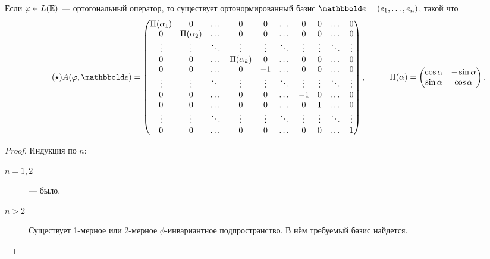 \documentclass[a4paper]{article}
\begin{document}
\begin{colloq}
            \begin{theorem}
                Если $\varphi \in L(\mathbb{E})$ --- ортогональный оператор, то существует ортонормированный базис $\E = (e_1, \dots, e_n)$, такой что 
                \begin{equation*}
                    \label{lec30:zhopa}
                    \tag{$\star$}
                    A(\phi, \E) = \begin{pmatrix} 
                        \Pi(\alpha_1) & 0 & \dots & 0 & 0 & \dots & 0 & 0 & \dots & 0 \\ 
                        0 & \Pi(\alpha_2) & \dots & 0 & 0 & \dots & 0 & 0 & \dots & 0 \\
                        \vdots & \vdots & \ddots & \vdots & \vdots & \ddots & \vdots & \vdots & \ddots & \vdots \\
                        0 & 0 & \dots & \Pi(\alpha_k) & 0 & \dots & 0 & 0 & \dots & 0 \\
                        0 & 0 & \dots & 0 & -1 & \dots & 0& 0 & \dots & 0\\
                        \vdots & \vdots & \ddots & \vdots & \vdots & \ddots & \vdots & \vdots & \ddots & \vdots \\
                        0 & 0 & \dots & 0 & 0 & \dots & -1 & 0 & \dots & 0\\
                        0 & 0 & \dots & 0 & 0 & \dots & 0 & 1 & \dots & 0 \\
                        \vdots & \vdots & \ddots & \vdots & \vdots & \ddots & \vdots & \vdots & \ddots & \vdots \\
                        0 & 0 & \dots & 0 & 0 & \dots & 0 & 0 & \dots & 1
                    \end{pmatrix},
                    \hspace{1cm}
                    \Pi(\alpha) = \begin{pmatrix} \cos \alpha & -\sin \alpha \\ \sin \alpha & \cos \alpha \end{pmatrix}
                .\end{equation*}
            \end{theorem}

            \begin{proof}
                Индукция по $n$:
                \begin{description}
                \item[$n = 1, 2$]  --- было.
                \item[$n > 2$] Существует 1-мерное или 2-мерное $\phi$-инвариантное подпространство.
                    В нём требуемый базис найдется. 


\end{description}
\end{proof}
\end{colloq}
\end{document}
